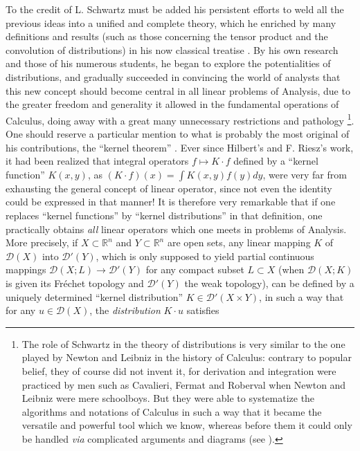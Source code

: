 \documentclass[12pt,a4paper,leqno,twoside]{extbook}
\newcommand{\R}{\mathbb{R}}
\begin{document}
To the credit of L. Schwartz must be added his persistent efforts to weld all the previous ideas into a unified and complete theory, which he enriched by many definitions and results (such as those concerning the tensor product and the convolution of distributions) in his now classical treatise \cite{194}. By his own research and those of his numerous students, he began to explore the potentialities of distributions, and gradually succeeded in convincing the world of analysts that this new concept should become central in all linear problems of Analysis, due to the greater freedom and generality it allowed in the fundamental operations of Calculus, doing away with a great many unnecessary restrictions and pathology \footnote{The role of Schwartz in the theory of distributions is very similar to the one played by Newton and Leibniz in the history of Calculus: contrary to popular belief, they of course did not invent it, for derivation and integration were practiced by men such as Cavalieri, Fermat and Roberval when Newton and Leibniz were mere schoolboys. But they were able to systematize the algorithms and notations of Calculus in such a way that it became the versatile and powerful tool which we know, whereas before them it could only be handled \emph{via} complicated arguments and diagrams (see \cite{028}).}. One should reserve a particular mention to what is probably the most original of his contributions, the ``kernel theorem'' \cite{195}. Ever since Hilbert's and F. Riesz's work, it had been realized that integral operators \(f \mapsto K \cdot f\) defined by a ``kernel function'' \(K(x,y)\), as \((K \cdot f)(x) = \int K(x,y)f(y)dy\), were very far from exhausting the general concept of linear operator, since not even the identity could be expressed in that manner! It is therefore very remarkable that if one replaces ``kernel functions'' by ``kernel distributions'' in that definition, one practically obtains \emph{all} linear operators which one meets in problems of Analysis. More precisely, if \(X \subset \R^n\) and \(Y \subset \R^n\) are open sets, any linear mapping \(K\) of \(\mathcal{D}(X)\) into \(\mathcal{D}'(Y)\), which is only supposed to yield partial continuous mappings \(\mathcal{D}(X; L) \to \mathcal{D}'(Y)\) for any compact subset \(L \subset X\) (when \(\mathcal{D}(X; K)\) is given its Fréchet topology and \(\mathcal{D}'(Y)\) the weak topology), can be defined by a uniquely determined ``kernel distribution'' \(K \in \mathcal{D}'(X \times Y)\), in such a way that for any \(u \in \mathcal{D}(X)\), the \emph{distribution} \(K \cdot u\) satisfies
\end{document}
